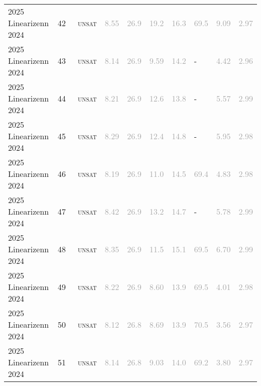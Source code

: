 \begin{center}
{\begin{longtable}{@{}llllllllll@{}}
2025 Linearizenn 2024 & 42 & ~\textsc{unsat} & \textcolor{darkgray}{8.55} & \textcolor{darkgray}{26.9} & \textcolor{darkgray}{19.2} & \textcolor{darkgray}{16.3} & \textcolor{darkgray}{69.5} & \textcolor{darkgray}{9.09} & \textcolor{darkgray}{2.97} \\
2025 Linearizenn 2024 & 43 & ~\textsc{unsat} & \textcolor{darkgray}{8.14} & \textcolor{darkgray}{26.9} & \textcolor{darkgray}{9.59} & \textcolor{darkgray}{14.2} & - & \textcolor{darkgray}{4.42} & \textcolor{darkgray}{2.96} \\
2025 Linearizenn 2024 & 44 & ~\textsc{unsat} & \textcolor{darkgray}{8.21} & \textcolor{darkgray}{26.9} & \textcolor{darkgray}{12.6} & \textcolor{darkgray}{13.8} & - & \textcolor{darkgray}{5.57} & \textcolor{darkgray}{2.99} \\
2025 Linearizenn 2024 & 45 & ~\textsc{unsat} & \textcolor{darkgray}{8.29} & \textcolor{darkgray}{26.9} & \textcolor{darkgray}{12.4} & \textcolor{darkgray}{14.8} & - & \textcolor{darkgray}{5.95} & \textcolor{darkgray}{2.98} \\
2025 Linearizenn 2024 & 46 & ~\textsc{unsat} & \textcolor{darkgray}{8.19} & \textcolor{darkgray}{26.9} & \textcolor{darkgray}{11.0} & \textcolor{darkgray}{14.5} & \textcolor{darkgray}{69.4} & \textcolor{darkgray}{4.83} & \textcolor{darkgray}{2.98} \\
2025 Linearizenn 2024 & 47 & ~\textsc{unsat} & \textcolor{darkgray}{8.42} & \textcolor{darkgray}{26.9} & \textcolor{darkgray}{13.2} & \textcolor{darkgray}{14.7} & - & \textcolor{darkgray}{5.78} & \textcolor{darkgray}{2.99} \\
2025 Linearizenn 2024 & 48 & ~\textsc{unsat} & \textcolor{darkgray}{8.35} & \textcolor{darkgray}{26.9} & \textcolor{darkgray}{11.5} & \textcolor{darkgray}{15.1} & \textcolor{darkgray}{69.5} & \textcolor{darkgray}{6.70} & \textcolor{darkgray}{2.99} \\
2025 Linearizenn 2024 & 49 & ~\textsc{unsat} & \textcolor{darkgray}{8.22} & \textcolor{darkgray}{26.9} & \textcolor{darkgray}{8.60} & \textcolor{darkgray}{13.9} & \textcolor{darkgray}{69.5} & \textcolor{darkgray}{4.01} & \textcolor{darkgray}{2.98} \\
2025 Linearizenn 2024 & 50 & ~\textsc{unsat} & \textcolor{darkgray}{8.12} & \textcolor{darkgray}{26.8} & \textcolor{darkgray}{8.69} & \textcolor{darkgray}{13.9} & \textcolor{darkgray}{70.5} & \textcolor{darkgray}{3.56} & \textcolor{darkgray}{2.97} \\
2025 Linearizenn 2024 & 51 & ~\textsc{unsat} & \textcolor{darkgray}{8.14} & \textcolor{darkgray}{26.8} & \textcolor{darkgray}{9.03} & \textcolor{darkgray}{14.0} & \textcolor{darkgray}{69.2} & \textcolor{darkgray}{3.80} & \textcolor{darkgray}{2.97} \\

\end{longtable}}
\end{center}
